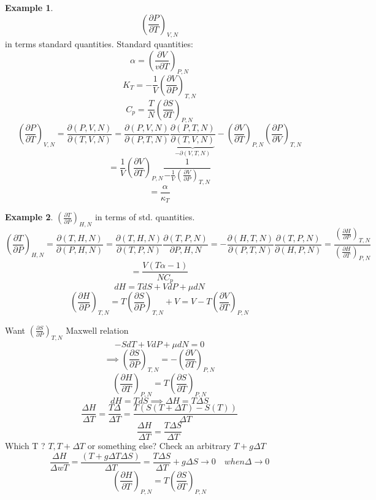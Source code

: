 \documentclass[11pt]{book}
\theoremstyle{definition}
\newtheorem{exm}{Example}[section]
\begin{document}
\begin{exm}
	\[ \left( \frac{\partial P}{\partial T} \right)_{V,N}  \] 
	in terms standard quantities.
	Standard quantities:
	\[ \alpha  = \left( \frac{\partial V}{v \partial T} \right)_{P,N} \] 
	\[ K_T = -\frac{1}{V} \left (\frac{\partial V}{\partial P} \right)_{T,N}\] 
\[ C_p = \frac{T}{N} \left (\frac{\partial S}{\partial T} \right )_{P,N} \] 
\[ \left( \frac{\partial P}{\partial T} \right)_{V,N} = \frac{\partial (P,V,N)}{\partial (T,V,N)} = 
\frac{\partial (P,V,N)}{\partial (P,T,N)} \frac{\partial (P,T,N)}{ \underbrace{\partial (T,V,N)}_{-\partial(V,T,N)} } 
- \left( \frac{\partial V}{\partial T} \right)_{P,N} \left( \frac{\partial P}{\partial V} \right)_{T,N}  \] 
\[ = \frac{1}{V} \left( \frac{\partial V}{\partial T} \right)_{P,N} \frac{1}{-\frac{1}{V}\left( \frac{\partial V}{\partial P} \right)_{T,N} }  \] 
\[ = \frac{\alpha}{\kappa_T} \] 
\end{exm}

\begin{exm}
	$ \left( \frac{\partial T}{\partial P} \right)_{H,N}  $ in terms of std. quantities.
	\[ \left( \frac{\partial T}{\partial P} \right)_{H,N} = \frac{\partial (T,H,N)}{\partial (P,H,N)} = \frac{\partial (T,H,N)}{\partial (T,P,N)} \frac{\partial (T,P,N)}{\partial P,H,N} = - \frac{\partial (H,T,N)}{\partial (P,T,N)} \frac{\partial (T,P,N)}{\partial (H,P,N)} = \frac{\left( \frac{\partial H}{\partial P} \right)_{T,N} }{\left( \frac{\partial H}{\partial T} \right)_{P,N} } \] 
	\[ = \frac{V(T \alpha -1)}{N C_p} \] 
	\[ dH = TdS +V dP + \mu dN \] 
	\[ \left( \frac{\partial H}{\partial P} \right)_{T,N} = T \left( \frac{\partial S}{\partial P} \right)_{T,N} + V  = V - T \left( \frac{\partial V}{\partial T} \right)_{P,N} \] 

Want $ \left( \frac{\partial S}{\partial P} \right)_{T,N}  $ Maxwell relation
\[ -SdT + VdP + \mu dN = 0 \] 
\[ \implies \left( \frac{\partial S}{\partial P} \right)_{T,N} =  -\left( \frac{\partial V}{\partial T} \right)_{P,N}   \] 
\[ \left( \frac{\partial H}{\partial T} \right)_{P,N} = T \left( \frac{\partial S}{\partial T} \right)_{P,N}   \] 
\[ dH = TdS \implies \Delta H = T \Delta S \] 
\[ \frac{\Delta H}{\Delta T} = \frac{T \Delta}{\Delta T} = \frac{T(S(T+\Delta T) - S(T))}{\Delta T} \] 
\[ \frac{\Delta H}{\Delta T} = \frac{T \Delta S}{\Delta T} \] 
Which T ? $ T, T + \Delta T $  or something else?
Check an arbitrary $ T + g \Delta T $ 
\[ \frac{\Delta H}{\Delta wT} = \frac{(T+g \Delta T \Delta S)}{\Delta T} = \frac{T \Delta S}{\Delta T}+ g \Delta S \to 0 \quad when \Delta \to 0  \] 
\[ \left( \frac{\partial H}{\partial T} \right)_{P,N} = T \left (\frac{\partial S}{\partial T} \right )_{P,N}  \] 
\end{exm}
\end{document}
